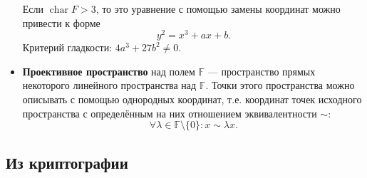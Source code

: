 \documentclass[a4paper,14pt]{extarticle}
\DeclareMathOperator{\chr}{char}
\begin{document}
\begin{itemize}
        Если $\chr F > 3$, то это уравнение с помощью замены
        координат можно привести к форме
        \[
            y^2 = x^3 + a x + b.
        \]
        Критерий гладкости: $4 a^3 + 27 b^2 \ne 0$.
    \item \textbf{Проективное пространство} над полем $\mathbb{F}$ ---
        пространство прямых некоторого линейного пространства над $\mathbb{F}$.
        Точки этого пространства можно описывать с помощью однородных координат,
        т.е. координат точек исходного пространства с определённым на них
        отношением эквивалентности $\sim$:
        \[
            \forall \lambda \in \mathbb{F} \setminus \{0\}: x \sim \lambda x.
        \]
\end{itemize}

\subsection{Из криптографии}
\end{document}
